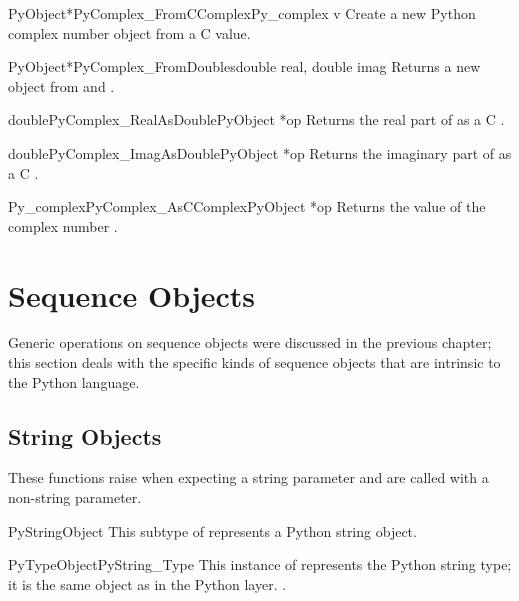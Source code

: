 \begin{cfuncdesc}{PyObject*}{PyComplex_FromCComplex}{Py_complex v}
  Create a new Python complex number object from a C
   value.
\end{cfuncdesc}

\begin{cfuncdesc}{PyObject*}{PyComplex_FromDoubles}{double real, double imag}
  Returns a new  object from  and
  .
\end{cfuncdesc}

\begin{cfuncdesc}{double}{PyComplex_RealAsDouble}{PyObject *op}
  Returns the real part of  as a C .
\end{cfuncdesc}

\begin{cfuncdesc}{double}{PyComplex_ImagAsDouble}{PyObject *op}
  Returns the imaginary part of  as a C .
\end{cfuncdesc}

\begin{cfuncdesc}{Py_complex}{PyComplex_AsCComplex}{PyObject *op}
  Returns the  value of the complex number
  .
\end{cfuncdesc}



\section{Sequence Objects \label{sequenceObjects}}

Generic operations on sequence objects were discussed in the previous
chapter; this section deals with the specific kinds of sequence
objects that are intrinsic to the Python language.


\subsection{String Objects \label{stringObjects}}

These functions raise  when expecting a string
parameter and are called with a non-string parameter.

\begin{ctypedesc}{PyStringObject}
  This subtype of  represents a Python string object.
\end{ctypedesc}

\begin{cvardesc}{PyTypeObject}{PyString_Type}
  This instance of  represents the Python string
  type; it is the same object as  in the Python
  layer.
  .
\end{cvardesc}

